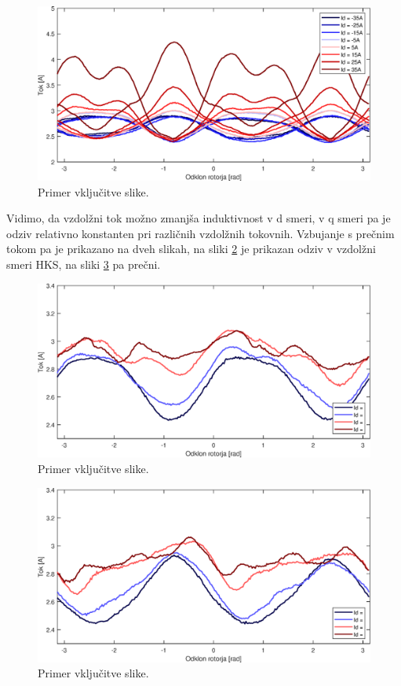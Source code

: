\documentclass[a4paper,twoside,openright,12pt,slovene]{book}
\begin{document}
\begin{figure}[!htbp]
    \centering
    \includegraphics[width=1\columnwidth]{Slike/tokovniOdzivId.eps}
    \caption{\label{tokovniOdzivId} Primer vključitve slike.}
\end{figure}

Vidimo, da vzdolžni tok možno zmanjša induktivnost v d smeri, v q smeri pa je odziv relativno konstanten pri različnih vzdolžnih tokovnih.
Vzbujanje s prečnim tokom pa je prikazano na dveh slikah, na sliki \ref{tokovniOdzivIq_IdAmp} je prikazan odziv v vzdolžni smeri HKS, na sliki \ref{tokovniOdzivIq_IqAmp} pa prečni. 

\begin{figure}[!htbp]
    \centering
    \includegraphics[width=1\columnwidth]{Slike/tokovniOdzivIq_IdAmp.eps}
    \caption{\label{tokovniOdzivIq_IdAmp} Primer vključitve slike.}
\end{figure}

\begin{figure}[!htbp]
    \centering
    \includegraphics[width=1\columnwidth]{Slike/tokovniOdzivIq_IqAmp.eps}
    \caption{\label{tokovniOdzivIq_IqAmp} Primer vključitve slike.}
\end{figure}
 
\end{document}
